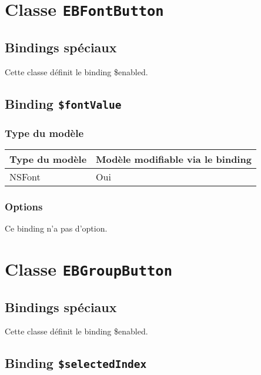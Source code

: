 \section{Classe \texttt{EBFontButton}}

\subsection{Bindings spéciaux}

Cette classe définit le binding \$enabled.

\subsection{Binding \texttt{\$fontValue}}

\subsubsection{Type du modèle}

\begin{tabular}{|l|l|}
\hline
\textbf{Type du modèle} & \textbf{Modèle modifiable via le binding}\\
\hline
NSFont & Oui\\
\hline
\end{tabular}
\subsubsection{Options}

Ce binding n'a pas d'option.








\section{Classe \texttt{EBGroupButton}}

\subsection{Bindings spéciaux}

Cette classe définit le binding \$enabled.

\subsection{Binding \texttt{\$selectedIndex}}

